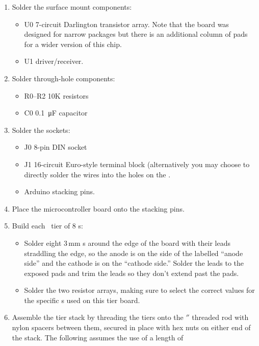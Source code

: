 \begin{enumerate}
	\item Solder the surface mount components:
		\begin{itemize}
			\item U0  7-circuit  Darlington transistor array.
				Note that the board was designed for narrow  packages but
				there is an additional column of pads for a wider version of this chip.
			\item U1   driver/receiver.
		\end{itemize}
	\item Solder through-hole components:
		\begin{itemize}
			\item R0--R2 10K resistors
			\item C0 \SI{0.1}{\micro\farad} capacitor
		\end{itemize}
	\item Solder the sockets:
		\begin{itemize}
			\item J0 8-pin DIN socket
			\item J1 16-circuit Euro-style terminal block (alternatively you may choose to
				directly solder the  wires into the holes on the .
			\item Arduino stacking pins.
		\end{itemize}
	\item Place the microcontroller board onto the stacking pins.
	\item Build each \led\ tier of 8 \led s:
		\begin{itemize}
			\item Solder eight 3\,mm \led s around the edge of the board with their leads straddling
				the edge, so the anode is on the side of the  labelled ``anode side'' and the
				cathode is on the ``cathode side.'' Solder the leads to the exposed pads and trim the
				leads so they don't extend past the pads.
			\item Solder the two resistor arrays, making sure to select the correct values for the specific
				\led s used on this tier board.
		\end{itemize}
	\item Assemble the tier stack by threading the tiers onto the $''$ threaded rod with nylon spacers between them,
		secured in place with hex nuts on either end of the stack. The following assumes the use of a length of 

\end{enumerate}

